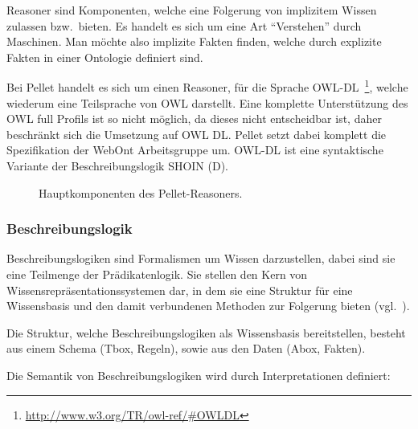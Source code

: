 Reasoner sind Komponenten, welche eine Folgerung von implizitem Wissen zulassen bzw.\ bieten. Es handelt es sich um eine Art ``Verstehen'' durch Maschinen. Man möchte also implizite Fakten finden, welche durch explizite Fakten in einer Ontologie definiert sind. 

Bei Pellet handelt es sich um einen Reasoner, für die Sprache OWL-DL~\footnote{\url{http://www.w3.org/TR/owl-ref/\#OWLDL}}, welche wiederum eine Teilsprache von OWL darstellt. Eine komplette Unterstützung des OWL full Profils ist so nicht möglich, da dieses nicht entscheidbar ist, daher beschränkt sich die Umsetzung auf OWL DL\@. Pellet setzt dabei komplett die Spezifikation der WebOnt Arbeitsgruppe um. OWL-DL ist eine syntaktische Variante der Beschreibungslogik SHOIN (D).

\begin{figure}[htbp]
\centering {}
\caption{Hauptkomponenten des Pellet-Reasoners.\label{fig:pellet_komponenten}\protect\footnotemark}
\end{figure}

\subsubsection{Beschreibungslogik}
\label{subsubsection:beschreibungslogik}
Beschreibungslogiken sind Formalismen um Wissen darzustellen, dabei sind sie eine Teilmenge der Prädikatenlogik. Sie stellen den Kern von Wissensrepräsentationssystemen dar, in dem sie eine Struktur für eine Wissensbasis und den damit verbundenen Methoden zur Folgerung bieten (vgl.~\cite{dl:baader2003}).

Die Struktur, welche Beschreibungslogiken als Wissensbasis bereitstellen, besteht aus einem Schema (Tbox, Regeln), sowie aus den Daten (Abox, Fakten).

Die Semantik von Beschreibungslogiken wird durch Interpretationen definiert:

